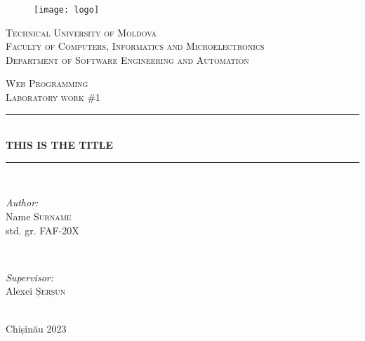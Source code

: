 \begin{titlepage}
  \begin{center}
  \begin{figure}[!h]
    \centering
    \texttt{[image: logo]}
  \end{figure}

  \textsc{\large Technical University of Moldova}\\[0.5cm]
  \textsc{\large Faculty of Computers, Informatics and Microelectronics}\\[0.5cm]
  \textsc{\large Department of Software Engineering and Automation}\\[1.2cm]

  \vspace{25 mm}

  \textsc{\Large Web Programming}\\[0.5cm]
  \textsc{\large Laboratory work \#1}\\[0.5cm]    %

  \newcommand{\HRule}{\rule{\linewidth}{0.5mm}}
  \vspace{10 mm}
  \HRule \\[0.4cm]
  { \LARGE \bfseries THIS IS THE TITLE }\\[0.4cm] %
  \HRule \\[1.5cm]

  \vspace{10mm}

  \begin{minipage}[t]{0.4\textwidth}
  \begin{flushleft} \large
  \emph{Author:} \\
  Name \textsc{Surname}\\                %
  std. gr. FAF-20X                       %
  \end{flushleft}
  \end{minipage}
  ~
  \begin{minipage}[t]{0.4\textwidth}
  \begin{flushright} \large
  \emph{Supervisor:} \\
  Alexei \textsc{Șerșun}\\
  \end{flushright}
  \end{minipage}\\[3cm]

  \vspace{5 mm}
  \large Chișinău 2023\\[0.5cm]

  \vfill
  \end{center}

\end{titlepage}

